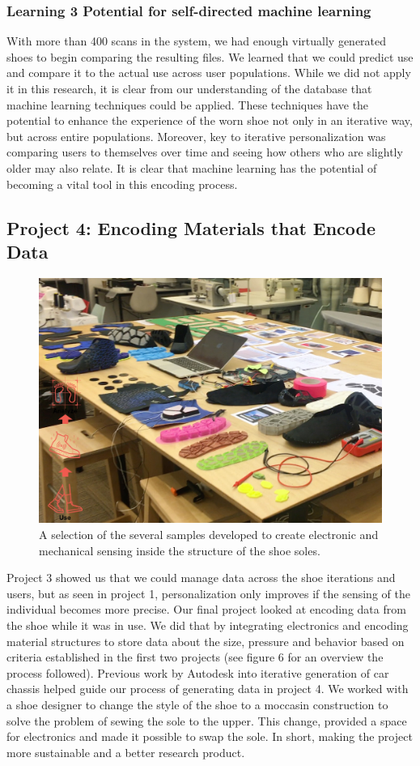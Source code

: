 \subsubsection{Learning 3 Potential for self-directed machine learning}

With more than 400 scans in the system, we had enough virtually generated shoes to begin comparing the resulting files. We learned that we could predict use and compare it to the actual use across user populations. While we did not apply it in this research, it is clear from our understanding of the database that machine learning techniques could be applied. These techniques have the potential to enhance the experience of the worn shoe not only in an iterative way, but across entire populations. Moreover, key to iterative personalization was comparing users to themselves over time and seeing how others who are slightly older may also relate. It is clear that machine learning has the potential of becoming a vital tool in this encoding process.

\subsection{Project 4: Encoding Materials that Encode Data}


\begin{figure}
\includegraphics[width=.5\textwidth]{Eva}
\caption{A selection of the several samples developed to create electronic and mechanical sensing inside the structure of the shoe soles.}
\label{fig:Project4}
\end{figure}

Project 3 showed us that we could manage data across the shoe iterations and users, but as seen in project 1, personalization only improves if the sensing of the individual becomes more precise. Our final project looked at encoding data from the shoe while it was in use. We did that by integrating electronics and encoding material structures to store data about the size, pressure and behavior based on criteria established in the first two projects (see figure 6 for an overview the process followed). Previous work by Autodesk into iterative generation of car chassis \cite{Nourbakhsh2016} helped guide our process of generating data in project 4. We worked with a shoe designer to change the style of the shoe to a moccasin construction to solve the problem of sewing the sole to the upper. This change, provided a space for electronics and made it possible to swap the sole. In short, making the project more sustainable and a better research product.

